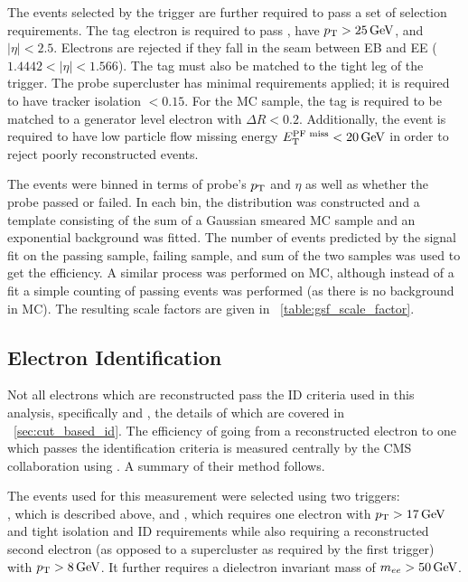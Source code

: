 The events selected by the trigger are further required to pass a set of
selection requirements. The tag electron is required to pass \EGTIGHT, have
$p_{\mathrm{T}} > 25 \,\text{Ge\hspace{-.08em}V}$, and $|\eta| < 2.5$. Electrons are rejected if they fall in the
seam between EB and EE ($1.4442 < |\eta| < 1.566$). The tag must also be
matched to the tight leg of the \TnP trigger. The probe supercluster has
minimal requirements applied; it is required to have tracker isolation $<
0.15$. For the MC sample, the tag is required to be matched to a generator
level electron with $\Delta R < 0.2$. Additionally, the event is required to
have low particle flow missing energy $E_{\mathrm{T}}^{\text{PF miss}} < 20 \,\text{Ge\hspace{-.08em}V}$ in order to reject
poorly reconstructed events.

The events were binned in terms of probe's $p_{\mathrm{T}}$ and $\eta$ as well as whether
the probe passed or failed. In each bin, the \mee distribution was constructed
and a template consisting of the sum of a Gaussian smeared \Ztoee MC sample and
an exponential background was fitted. The number of events predicted by the
signal fit on the passing sample, failing sample, and sum of the two samples
was used to get the efficiency. A similar process was performed on MC, although
instead of a fit a simple counting of passing events was performed (as there is
no background in MC). The resulting scale factors are given in
\TAB~\ref{table:gsf_scale_factor}.



\subsection{Electron Identification}
\label{ssec:sf_id}

Not all electrons which are reconstructed pass the ID criteria used in this
analysis, specifically \EGMEDIUM and \EGTIGHT, the details of which are covered
in \SEC~\ref{sec:cut_based_id}. The efficiency of going from a
reconstructed electron to one which passes the identification criteria is
measured centrally by the CMS collaboration using \TnP \cite{cms_an_2014-055}.
A summary of their method follows.

The events used for this measurement were selected using two triggers: \\
\TnPTrigger, which is described above, and \TnPTriggerSecond, which requires
one electron with $p_{\mathrm{T}} > 17 \,\text{Ge\hspace{-.08em}V}$ and tight isolation and ID requirements while
also requiring a reconstructed second electron (as opposed to a supercluster as
required by the first trigger) with $p_{\mathrm{T}} > 8 \,\text{Ge\hspace{-.08em}V}$. It further requires a
dielectron invariant mass of $m_{ee} > 50 \,\text{Ge\hspace{-.08em}V}$.

